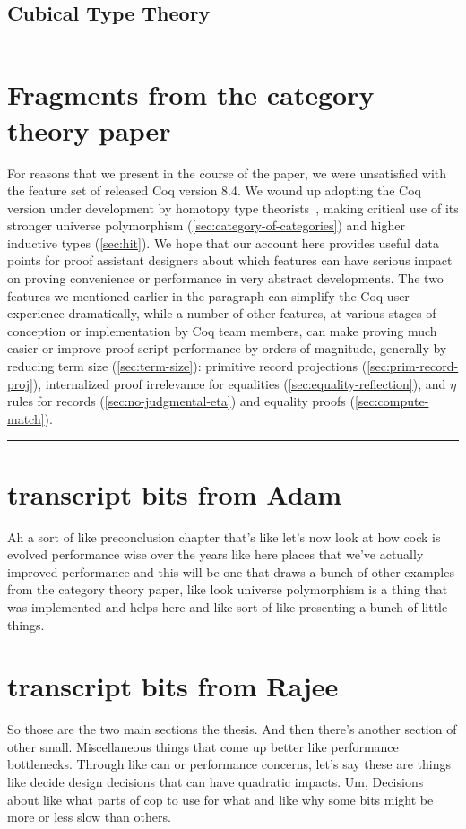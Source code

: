 \subsection{Cubical Type Theory}\label{sec:fixes:theory:cubical}\label{sec:cubical}
$\left.\right.$


\begin{subappendices}
    \section{Fragments from the category theory paper}
    For reasons that we present in the course of the paper, we were unsatisfied with the feature set of released Coq version 8.4.  We wound up adopting the Coq version under development by homotopy type theorists~\cite{HoTT/coq}, making critical use of its stronger universe polymorphism (\autoref{sec:category-of-categories}) and higher inductive types (\autoref{sec:hit}).  We hope that our account here provides useful data points for proof assistant designers about which features can have serious impact on proving convenience or performance in very abstract developments.  The two features we mentioned earlier in the paragraph can simplify the Coq user experience dramatically, while a number of other features, at various stages of conception or implementation by Coq team members, can make proving much easier or improve proof script performance by orders of magnitude, generally by reducing term size (\autoref{sec:term-size}): primitive record projections (\autoref{sec:prim-record-proj}), internalized proof irrelevance for equalities (\autoref{sec:equality-reflection}), and $\eta$ rules for records (\autoref{sec:no-judgmental-eta}) and equality proofs (\autoref{sec:compute-match}).

    \hrule


    \section{transcript bits from Adam}
    Ah a sort of like preconclusion chapter that's like let's now look at how cock is evolved performance wise over the years like here places that we've actually improved performance and this will be one that draws a bunch of other examples from the category theory paper, like look universe polymorphism is a thing that was implemented and helps here and like sort of like presenting a bunch of little things.
\section{transcript bits from Rajee}
So those are the two main sections the thesis. And then there's another section of other small. Miscellaneous things that come up better like performance bottlenecks. Through like can or performance concerns, let's say these are things like decide design decisions that can have quadratic impacts. Um, Decisions about like what parts of cop to use for what and like why some bits might be more or less slow than others.


\end{subappendices}
